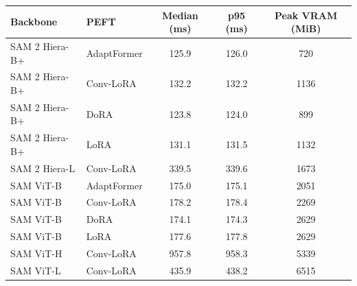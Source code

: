 \begin{tabular}{llccc}
\toprule
Backbone & PEFT & Median (ms) & p95 (ms) & Peak VRAM (MiB) \\
\midrule
SAM 2 Hiera-B+ & AdaptFormer & 125.9 & 126.0 & 720 \\
SAM 2 Hiera-B+ & Conv-LoRA & 132.2 & 132.2 & 1136 \\
SAM 2 Hiera-B+ & DoRA & 123.8 & 124.0 & 899 \\
SAM 2 Hiera-B+ & LoRA & 131.1 & 131.5 & 1132 \\
SAM 2 Hiera-L & Conv-LoRA & 339.5 & 339.6 & 1673 \\
SAM ViT-B & AdaptFormer & 175.0 & 175.1 & 2051 \\
SAM ViT-B & Conv-LoRA & 178.2 & 178.4 & 2269 \\
SAM ViT-B & DoRA & 174.1 & 174.3 & 2629 \\
SAM ViT-B & LoRA & 177.6 & 177.8 & 2629 \\
SAM ViT-H & Conv-LoRA & 957.8 & 958.3 & 5339 \\
SAM ViT-L & Conv-LoRA & 435.9 & 438.2 & 6515 \\
\bottomrule
\end{tabular}

